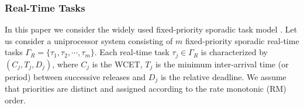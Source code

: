 \documentclass[../rt_server_main.tex]{subfiles}
\begin{document}
\subsubsection{Real-Time Tasks}
In this paper we consider the widely used fixed-priority sporadic task %
model \cite{sporadic_task}. Let us consider a uniprocessor system consisting of $m$ fixed-priority
sporadic real-time tasks $\Gamma_R = \lbrace \tau_1, \tau_2, \cdots , \tau_m \rbrace$. Each real-time task $\tau_j \in \Gamma_R$ is characterized by $(C_j, T_j , D_j)$, where $C_j$ is the WCET, $T_j$ is the minimum inter-arrival time (or period) between successive releases and $D_j$ is the relative deadline.  We assume that priorities are distinct and assigned according to the rate monotonic (RM) \cite{Liu_n_Layland1973} order. %


\end{document}
